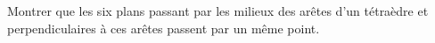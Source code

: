 Montrer que les six plans passant par les milieux des arêtes d'un tétraèdre et perpendiculaires à ces arêtes passent par un même point.
